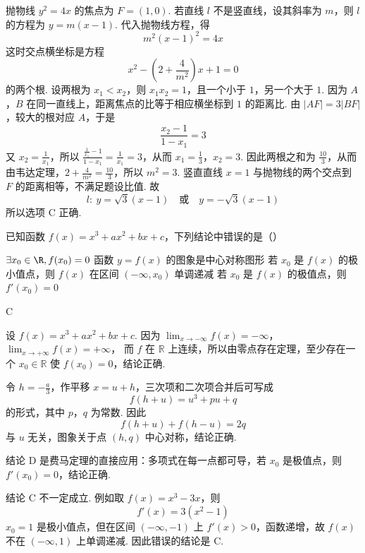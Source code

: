 \begin{solution}
抛物线 \(y^2=4x\) 的焦点为 \(F=(1,0)\). 若直线 \(l\) 不是竖直线，设其斜率为 \(m\)，则 \(l\) 的方程为 \(y=m(x-1)\). 代入抛物线方程，得
\[
m^2(x-1)^2=4x
\]
这时交点横坐标是方程
\[
x^2-\left(2+\frac{4}{m^2}\right)x+1=0
\]
的两个根. 设两根为 \(x_1<x_2\)，则 \(x_1x_2=1\)，且一个小于 \(1\)，另一个大于 \(1\). 因为 \(A\)，\(B\) 在同一直线上，距离焦点的比等于相应横坐标到 \(1\) 的距离比. 由 \(|AF|=3|BF|\)，较大的根对应 \(A\)，于是
\[
\frac{x_2-1}{1-x_1}=3
\]
又 \(x_2=\frac{1}{x_1}\)，所以 \(\frac{\frac{1}{x_1}-1}{1-x_1}=\frac1{x_1}=3\)，从而 \(x_1=\frac13\)，\(x_2=3\).
因此两根之和为 \(\frac{10}{3}\)，从而
由韦达定理，\(2+\frac{4}{m^2}=\frac{10}{3}\)，所以 \(m^2=3\).
竖直直线 \(x=1\) 与抛物线的两个交点到 \(F\) 的距离相等，不满足题设比值. 故
\[
l:\ y=\sqrt{3}(x-1)\quad\text{或}\quad y=-\sqrt{3}(x-1)
\]
所以选项 C 正确.
\end{solution}

\begin{problem}
已知函数 \( f(x) = x^{3} + ax^{2} + bx + c \)，下列结论中错误的是（\quad）

\choices
    {\(\exists x_{0}\in \R, f(x_{0}) = 0\)}
    {函数 \( y = f(x) \) 的图象是中心对称图形}
    {若 \(x_0\) 是 \(f(x)\) 的极小值点，则 \(f(x)\) 在区间 \((- \infty, x_0)\) 单调递减}
    {若 \(x_0\) 是 \(f(x)\) 的极值点，则 \(f'(x_0) = 0\)}
\end{problem}

\begin{answer}
C
\end{answer}

\begin{solution}
设 \(f(x)=x^3+ax^2+bx+c\). 因为 \(\lim_{x\to-\infty}f(x)=-\infty\)，\(\lim_{x\to+\infty}f(x)=+\infty\)，
而 \(f\) 在 \(\mathbb R\) 上连续，所以由零点存在定理，至少存在一个 \(x_0\in\mathbb R\) 使 \(f(x_0)=0\)，结论正确.

令 \(h=-\frac{a}{3}\)，作平移 \(x=u+h\)，三次项和二次项合并后可写成
\[
f(h+u)=u^3+pu+q
\]
的形式，其中 \(p\)，\(q\) 为常数. 因此
\[
f(h+u)+f(h-u)=2q
\]
与 \(u\) 无关，图象关于点 \((h,q)\) 中心对称，结论正确.

结论 D 是费马定理的直接应用：多项式在每一点都可导，若 \(x_0\) 是极值点，则 \(f'(x_0)=0\)，结论正确.

结论 C 不一定成立. 例如取 \(f(x)=x^3-3x\)，则
\[
f'(x)=3(x^2-1)
\]
\(x_0=1\) 是极小值点，但在区间 \((-\infty,-1)\) 上 \(f'(x)>0\)，函数递增，故 \(f(x)\) 不在 \((-\infty,1)\) 上单调递减. 因此错误的结论是 C.
\end{solution}

